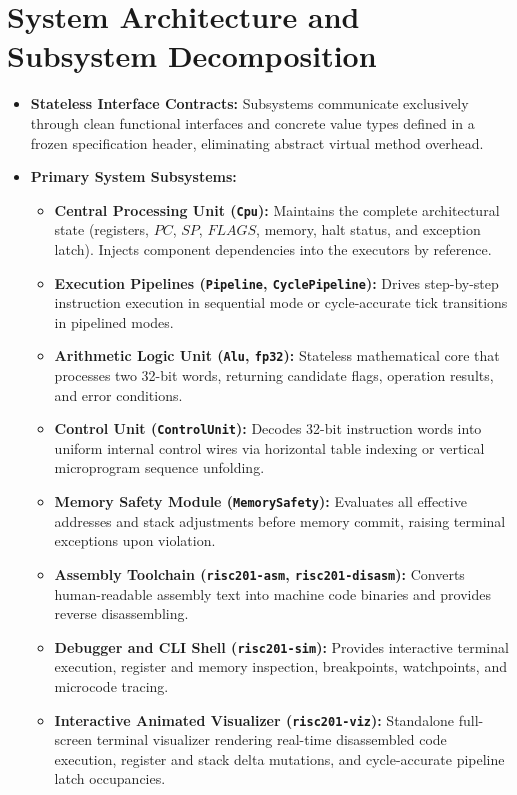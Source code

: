 \documentclass[11pt,a4paper]{article}
\begin{document}
\section{System Architecture and Subsystem Decomposition}

\begin{itemize}
    \item \textbf{Stateless Interface Contracts:} Subsystems communicate exclusively through clean functional interfaces and concrete value types defined in a frozen specification header, eliminating abstract virtual method overhead.
    \item \textbf{Primary System Subsystems:}
    \begin{itemize}
        \item \textbf{Central Processing Unit (\texttt{Cpu}):} Maintains the complete architectural state (registers, $PC$, $SP$, $FLAGS$, memory, halt status, and exception latch). Injects component dependencies into the executors by reference.
        \item \textbf{Execution Pipelines (\texttt{Pipeline}, \texttt{CyclePipeline}):} Drives step-by-step instruction execution in sequential mode or cycle-accurate tick transitions in pipelined modes.
        \item \textbf{Arithmetic Logic Unit (\texttt{Alu}, \texttt{fp32}):} Stateless mathematical core that processes two 32-bit words, returning candidate flags, operation results, and error conditions.
        \item \textbf{Control Unit (\texttt{ControlUnit}):} Decodes 32-bit instruction words into uniform internal control wires via horizontal table indexing or vertical microprogram sequence unfolding.
        \item \textbf{Memory Safety Module (\texttt{MemorySafety}):} Evaluates all effective addresses and stack adjustments before memory commit, raising terminal exceptions upon violation.
        \item \textbf{Assembly Toolchain (\texttt{risc201-asm}, \texttt{risc201-disasm}):} Converts human-readable assembly text into machine code binaries and provides reverse disassembling.
        \item \textbf{Debugger and CLI Shell (\texttt{risc201-sim}):} Provides interactive terminal execution, register and memory inspection, breakpoints, watchpoints, and microcode tracing.
        \item \textbf{Interactive Animated Visualizer (\texttt{risc201-viz}):} Standalone full-screen terminal visualizer rendering real-time disassembled code execution, register and stack delta mutations, and cycle-accurate pipeline latch occupancies.
    \end{itemize}
\end{itemize}
\end{document}
